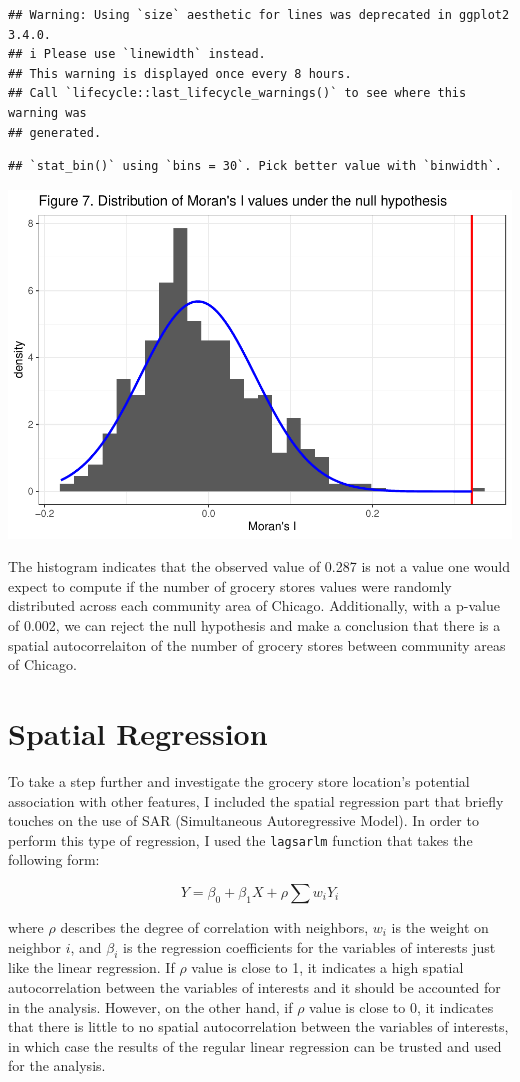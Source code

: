 \documentclass[
]{article}
\begin{document}
\begin{verbatim}
## Warning: Using `size` aesthetic for lines was deprecated in ggplot2 3.4.0.
## i Please use `linewidth` instead.
## This warning is displayed once every 8 hours.
## Call `lifecycle::last_lifecycle_warnings()` to see where this warning was
## generated.
\end{verbatim}

\begin{verbatim}
## `stat_bin()` using `bins = 30`. Pick better value with `binwidth`.
\end{verbatim}

\includegraphics[width=0.5\linewidth]{Sam-Song_Coding-Sample_files/figure-latex/unnamed-chunk-9-1}

The histogram indicates that the observed value of 0.287 is not a value
one would expect to compute if the number of grocery stores values were
randomly distributed across each community area of Chicago.
Additionally, with a p-value of 0.002, we can reject the null hypothesis
and make a conclusion that there is a spatial autocorrelaiton of the
number of grocery stores between community areas of Chicago.

\hypertarget{spatial-regression}{%
\section{Spatial Regression}\label{spatial-regression}}

To take a step further and investigate the grocery store location's
potential association with other features, I included the spatial
regression part that briefly touches on the use of SAR (Simultaneous
Autoregressive Model). In order to perform this type of regression, I
used the \texttt{lagsarlm} function that takes the following form:

\[Y = \beta_0 + \beta_1X + \rho\sum w_iY_i\]

where \(\rho\) describes the degree of correlation with neighbors,
\(w_i\) is the weight on neighbor \(i\), and \(\beta_i\) is the
regression coefficients for the variables of interests just like the
linear regression. If \(\rho\) value is close to 1, it indicates a high
spatial autocorrelation between the variables of interests and it should
be accounted for in the analysis. However, on the other hand, if
\(\rho\) value is close to 0, it indicates that there is little to no
spatial autocorrelation between the variables of interests, in which
case the results of the regular linear regression can be trusted and
used for the analysis.
\end{document}
